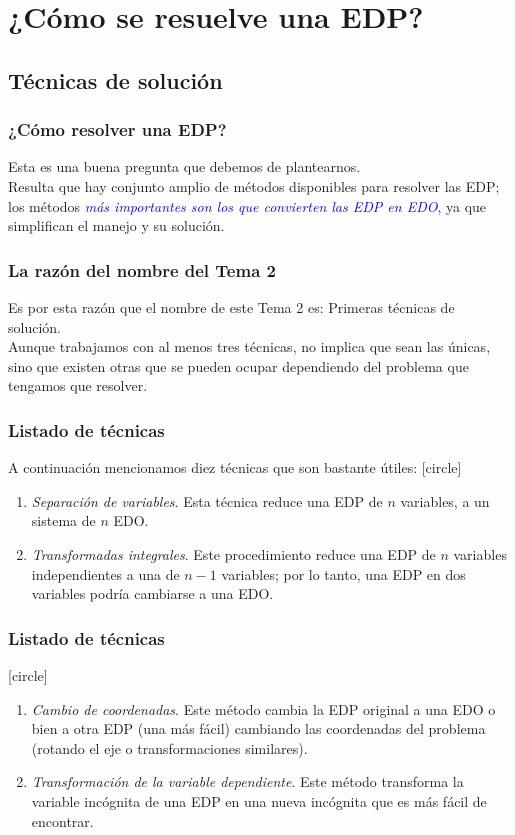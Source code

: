 \documentclass[12pt]{beamer}
\begin{document}
\section{¿Cómo se resuelve una EDP?}
\subsection{Técnicas de solución}

\begin{frame}
\frametitle{¿Cómo resolver una EDP?}
Esta es una buena pregunta que debemos de plantearnos.
\\
\bigskip
\pause
Resulta que hay conjunto amplio de métodos disponibles para resolver las EDP; \pause los métodos \emph{\textcolor{blue}{más importantes son los que convierten las EDP en EDO}}, ya que simplifican el manejo y su solución.
\end{frame}
\begin{frame}
\frametitle{La razón del nombre del Tema 2}
Es por esta razón que el nombre de este Tema 2 es: Primeras técnicas de solución.
\\
\bigskip
\pause
Aunque trabajamos con al menos tres técnicas, no implica que sean las únicas, sino que existen otras que se pueden ocupar dependiendo del problema que tengamos que resolver.
\end{frame}
\begin{frame}
\frametitle{Listado de técnicas}
A continuación mencionamos diez técnicas que son bastante útiles:
\pause
{}
[circle]
\begin{enumerate}[<+->]
\item \emph{Separación de variables}. Esta técnica reduce una EDP de $n$ variables, a un sistema de $n$ EDO.
\item \emph{Transformadas integrales}. Este procedimiento reduce una EDP de $n$ variables independientes a una de $n - 1$ variables; por lo tanto, una EDP en dos variables podría cambiarse a una EDO.
\seti
\end{enumerate}
\end{frame}
\begin{frame}
\frametitle{Listado de técnicas}
[circle]
\begin{enumerate}[<+->]
\conti    
\item \emph{Cambio de coordenadas}. Este método cambia la EDP original a una EDO o bien a otra EDP (una más fácil) cambiando las coordenadas del problema (rotando el eje o transformaciones similares).
\item \emph{Transformación de la variable dependiente}. Este método transforma la variable incógnita de una EDP en una nueva incógnita que es más fácil de encontrar.
\seti
\end{enumerate}
\end{frame}
\end{document}
